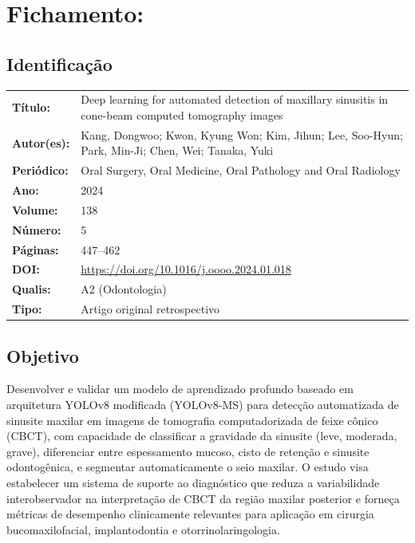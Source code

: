\section{Fichamento: }

\subsection{Identificação}
\begin{tabular}{ll}
\textbf{Título:} & Deep learning for automated detection of maxillary
sinusitis in cone-beam computed tomography images \\
\textbf{Autor(es):} & Kang, Dongwoo; Kwon, Kyung Won; Kim, Jihun;
Lee, Soo-Hyun; Park, Min-Ji; Chen, Wei; Tanaka, Yuki \\
\textbf{Periódico:} & Oral Surgery, Oral Medicine, Oral Pathology and Oral Radiology \\
\textbf{Ano:} & 2024 \\
\textbf{Volume:} & 138 \\
\textbf{Número:} & 5 \\
\textbf{Páginas:} & 447--462 \\
\textbf{DOI:} & \url{https://doi.org/10.1016/j.oooo.2024.01.018} \\
\textbf{Qualis:} & A2 (Odontologia) \\
\textbf{Tipo:} & Artigo original retrospectivo \\
\end{tabular}

\subsection{Objetivo}
Desenvolver e validar um modelo de aprendizado profundo baseado em
arquitetura YOLOv8 modificada (YOLOv8-MS) para detecção automatizada
de sinusite maxilar em imagens de tomografia computadorizada de feixe
cônico (CBCT), com capacidade de classificar a gravidade da sinusite
(leve, moderada, grave), diferenciar entre espessamento mucoso, cisto
de retenção e sinusite odontogênica, e segmentar automaticamente o
seio maxilar. O estudo visa estabelecer um sistema de suporte ao
diagnóstico que reduza a variabilidade interobservador na
interpretação de CBCT da região maxilar posterior e forneça métricas
de desempenho clinicamente relevantes para aplicação em cirurgia
bucomaxilofacial, implantodontia e otorrinolaringologia.

